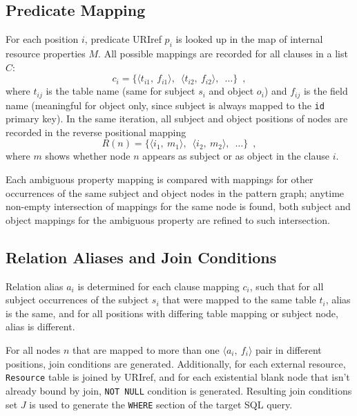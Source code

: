 \documentclass{llncs}
\begin{document}
\subsection{Predicate Mapping}

For each position $i$, predicate URIref $p_i$ is looked up in the map of
internal resource properties $M$. All possible mappings are recorded for all
clauses in a list $C$:
\begin{equation}
c_i = \{\langle t_{i1},~f_{i1} \rangle, \enspace \langle t_{i2},~f_{i2}
\rangle, \enspace \dots\} \enspace ,
\end{equation}
where $t_{ij}$ is the table name (same for subject $s_i$ and object $o_i$) and
$f_{ij}$ is the field name (meaningful for object only, since subject is
always mapped to the {\tt id} primary key). In the same iteration, all subject
and object positions of nodes are recorded in the reverse positional mapping
\begin{equation}
R(n) = \{\langle i_1,~m_1 \rangle, \enspace \langle i_2,~m_2 \rangle, \enspace
\dots\} \enspace ,
\end{equation}
where $m$ shows whether node $n$ appears as subject or as object in the clause
$i$.

Each ambiguous property mapping is compared with mappings for other
occurrences of the same subject and object nodes in the pattern graph; anytime
non-empty intersection of mappings for the same node is found, both subject
and object mappings for the ambiguous property are refined to such
intersection.

\subsection{Relation Aliases and Join Conditions}

Relation alias $a_i$ is determined for each clause mapping $c_i$, such that
for all subject occurrences of the subject $s_i$ that were mapped to the same
table $t_i$, alias is the same, and for all positions with differing table
mapping or subject node, alias is different.

For all nodes $n$ that are mapped to more than one $\langle a_i,~f_i \rangle$
pair in different positions, join conditions are generated. Additionally, for
each external resource, {\tt Resource} table is joined by URIref, and for each
existential blank node that isn't already bound by join, {\tt NOT NULL}
condition is generated. Resulting join conditions set $J$ is used to generate
the {\tt WHERE} section of the target SQL query.
\end{document}

